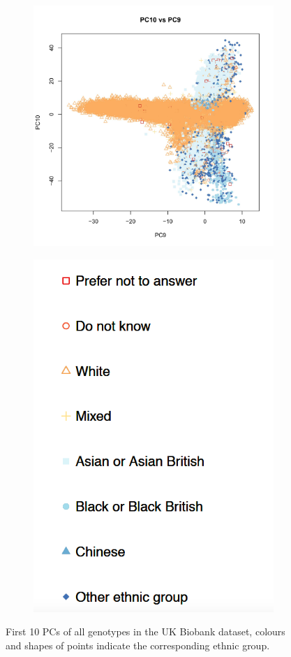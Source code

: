 \documentclass[a4paper,12pt]{article}
\begin{document}
\begin{figure}[h]
\begin{subfigure}{.32\textwidth}
  \label{fig:sfig2}
\end{subfigure} %
\begin{subfigure}{.32\textwidth}
  \centering
  \includegraphics[width=\linewidth]{pca9_10.jpg}
  \label{fig:sfig1}
\end{subfigure}%
\begin{subfigure}{.32\textwidth}
  \centering
  \includegraphics[width=.6\linewidth]{legend.png}
  \label{fig:sfig2}
\end{subfigure} %
\caption{First 10 PCs of all genotypes in the UK Biobank dataset, colours and shapes of points indicate the corresponding ethnic group.}
\label{fig:fig}
\end{figure} 
\end{document}
